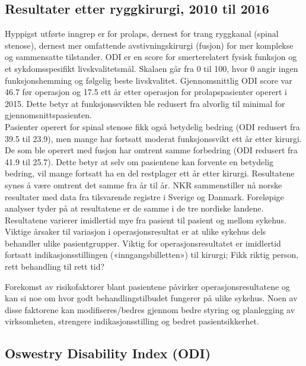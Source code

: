 \documentclass [norsk,a4paper,twoside]{article}\usepackage[]{graphicx}\usepackage[]{color}
\begin{document}
\subsection{ Resultater etter ryggkirurgi, 2010 til 2016}



Hyppigst utførte inngrep er for prolaps, dernest for trang ryggkanal (spinal stenose),
dernest mer omfattende avstivningskirurgi (fusjon) for mer komplekse og
sammensatte tilstander. 
ODI er en score for smerterelatert fysisk funksjon og et sykdomsspesifikt livskvalitetsmål. Skalaen går fra 0
til 100, hvor 0 angir ingen funksjonshemming og følgelig beste livskvalitet.
Gjennomsnittlig ODI score var 46.7 før operasjon og 17.5 ett år etter
operasjon for prolapspasienter operert i 2015. Dette betyr at funksjonssvikten ble redusert fra alvorlig til minimal for gjennomsnittspasienten. \\

Pasienter operert for spinal stenose fikk også
betydelig bedring (ODI redusert fra 39.5 til 23.9), men mange har 
fortsatt moderat funksjonssvikt ett år etter kirurgi. 
De som ble operert med fusjon har
omtrent samme forbedring (ODI redusert fra 41.9 til 25.7). 
Dette betyr at selv om
pasientene kan forvente en betydelig bedring, vil mange fortsatt ha en del restplager
ett år etter kirurgi. Resultatene synes å være omtrent det samme fra år til år. NKR
sammenstiller nå norske resultater med data fra tilsvarende registre i Sverige og
Danmark. Foreløpige analyser tyder på at resultatene er de samme i
de tre nordiske landene.
Resultatene varierer imidlertid mye fra pasient til pasient og mellom sykehus.
Viktige årsaker til variasjon i operasjonsresultat er at ulike sykehus dels behandler
ulike pasientgrupper. Viktig for operasjonsresultatet er imidlertid fortsatt
indikasjonsstillingen («inngangsbilletten») til kirurgi; Fikk riktig person, rett
behandling til rett tid?

Forekomst av risikofaktorer blant pasientene påvirker operasjonsresultatene og kan
si noe om hvor godt behandlingstilbudet fungerer på ulike sykehus. Noen av disse
faktorene kan modifiseres/bedres gjennom bedre styring og planlegging av
virksomheten, strengere indikasjonsstilling og bedret pasientsikkerhet.





\subsection{Oswestry Disability Index (ODI)}
\end{document}
